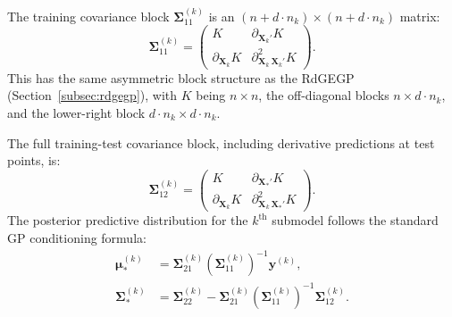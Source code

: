 \documentclass[12pt]{article}
\begin{document}
The training covariance block $\boldsymbol{\Sigma}^{(k)}_{11}$ is an $(n + d \cdot n_k) \times (n + d \cdot n_k)$ matrix:
\begin{equation}
	\label{eqn:wgek_S11}
	\boldsymbol{\Sigma}^{(k)}_{11} =
	\begin{pmatrix}
		K & \partial_{\mathbf{X}_k'} K \\
		\partial_{\mathbf{X}_k} K & \partial^2_{\mathbf{X}_k\,\mathbf{X}_k'} K
	\end{pmatrix}.
\end{equation}
This has the same asymmetric block structure as the RdGEGP (Section~\ref{subsec:rdgegp}), with $K$ being $n \times n$, the off-diagonal blocks $n \times d \cdot n_k$, and the lower-right block $d \cdot n_k \times d \cdot n_k$.

The full training-test covariance block, including derivative predictions at test points, is:
\begin{equation}
	\label{eqn:wgek_S12_full}
	\boldsymbol{\Sigma}^{(k)}_{12} =
	\begin{pmatrix}
		K & \partial_{\mathbf{X}_*'} K \\
		\partial_{\mathbf{X}_k} K & \partial^2_{\mathbf{X}_k\,\mathbf{X}_*'} K
	\end{pmatrix}.
\end{equation}
The posterior predictive distribution for the $k^{\text{th}}$ submodel follows the standard GP conditioning formula:
\begin{equation}
	\label{eqn:wgek_posterior}
	\begin{split}
		\boldsymbol{\mu}^{(k)}_{*} &= \boldsymbol{\Sigma}^{(k)}_{21} \left(\boldsymbol{\Sigma}^{(k)}_{11}\right)^{-1} \mathbf{y}^{(k)}, \\
		\boldsymbol{\Sigma}^{(k)}_{*} &=  \boldsymbol{\Sigma}^{(k)}_{22} - \boldsymbol{\Sigma}^{(k)}_{21} \left(\boldsymbol{\Sigma}^{(k)}_{11}\right)^{-1} \boldsymbol{\Sigma}^{(k)}_{12}.
	\end{split}
\end{equation}
\end{document}
